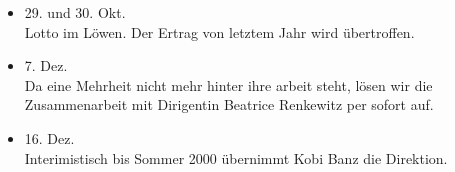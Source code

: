 \begin{history}
\begin{itemize}
        \item 29. und 30. Okt.\\
              Lotto im Löwen. Der Ertrag von letztem Jahr wird übertroffen.

        \item 7. Dez.\\
              Da eine Mehrheit nicht mehr hinter ihre arbeit steht, lösen wir die
              Zusammenarbeit mit Dirigentin Beatrice Renkewitz per sofort auf.

        \item 16. Dez.\\
              Interimistisch bis Sommer 2000 übernimmt Kobi Banz die Direktion.

    \end{itemize}

\end{history}
